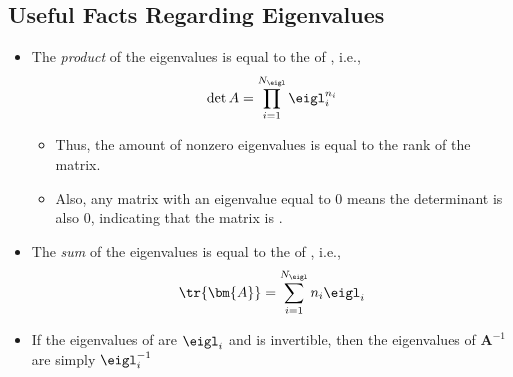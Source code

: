 \begin{itemize}
  \subsection{Useful Facts Regarding Eigenvalues}\label{Useful Facts Regarding Eigenvalues}
  \begin{itemize}
    \item The \emph{product} of the eigenvalues is equal to the \hyperref[The Determinant]{} of , i.e.,
    \[%
    \det{A} = \prod_{i=1}^{N_\eigl} \eigl_i^{n_i}
    \]%
    \begin{itemize}
      \item Thus, the amount of nonzero eigenvalues is equal to the rank of the matrix. 
      \item Also, any matrix with an eigenvalue equal to 0 means the determinant is also 0, indicating that the matrix is \hyperref[Matrix Inverse]{}.
    \end{itemize}
    \item The \emph{sum} of the eigenvalues is equal to the \hyperref[Diagonal and Trace]{} of , i.e.,
    \[%
    \tr{\bm{A}} = \sum_{i=1}^{N_\eigl} n_i\eigl_i
    \]%
    \item If the eigenvalues of  are \(\eigl_i\) and  is invertible, then the eigenvalues of \(\bm{A}^{-1}\) are simply \(\eigl_i ^{-1}\)
  \end{itemize} 
  
\end{itemize}

